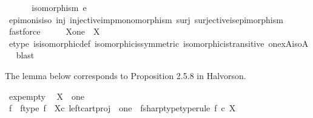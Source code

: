 \begin{isabellebody}
\ \ \isamarkupfalse%
\isanewline
\isanewline
\ \ \isamarkupfalse%
\ {\isachardoublequoteopen}isomorphism\ e{\isachardoublequoteclose}\isanewline
\ \ \ \ \isamarkupfalse%
\ epi{\isacharunderscore}{\kern0pt}mon{\isacharunderscore}{\kern0pt}is{\isacharunderscore}{\kern0pt}iso\ inj\ injective{\isacharunderscore}{\kern0pt}imp{\isacharunderscore}{\kern0pt}monomorphism\ surj\ surjective{\isacharunderscore}{\kern0pt}is{\isacharunderscore}{\kern0pt}epimorphism\ \isamarkupfalse%
\ fastforce\isanewline
\ \ \isamarkupfalse%
\ \isamarkupfalse%
\ {\isachardoublequoteopen}X\isactrlbsup one\isactrlesup \ {\isasymcong}\ X{\isachardoublequoteclose}\isanewline
\ \ \ \ \isamarkupfalse%
\ e{\isacharunderscore}{\kern0pt}type\ is{\isacharunderscore}{\kern0pt}isomorphic{\isacharunderscore}{\kern0pt}def\ isomorphic{\isacharunderscore}{\kern0pt}is{\isacharunderscore}{\kern0pt}symmetric\ isomorphic{\isacharunderscore}{\kern0pt}is{\isacharunderscore}{\kern0pt}transitive\ one{\isacharunderscore}{\kern0pt}x{\isacharunderscore}{\kern0pt}A{\isacharunderscore}{\kern0pt}iso{\isacharunderscore}{\kern0pt}A\ \isamarkupfalse%
\ blast\isanewline
{}\isamarkupfalse%
%
\endisatagproof
{\isafoldproof}%
%
\isadelimproof
%
\endisadelimproof
%
\begin{isamarkuptext}%
The lemma below corresponds to Proposition 2.5.8 in Halvorson.%
\end{isamarkuptext}\isamarkuptrue%
\isamarkupfalse%
\ exp{\isacharunderscore}{\kern0pt}empty{\isacharcolon}{\kern0pt}\isanewline
\ \ {\isachardoublequoteopen}X\isactrlbsup {\isasymemptyset}\isactrlesup \ {\isasymcong}\ one{\isachardoublequoteclose}\isanewline
%
\isadelimproof
%
\endisadelimproof
%
\isatagproof
{}\isamarkupfalse%
\ {\isacharminus}{\kern0pt}\ \isanewline
\ \ \isamarkupfalse%
\ f\ \ f{\isacharunderscore}{\kern0pt}type{\isacharcolon}{\kern0pt}\ {\isachardoublequoteopen}f\ {\isacharequal}{\kern0pt}\ {\isasymalpha}\isactrlbsub X\isactrlesub {\isasymcirc}\isactrlsub c\ {\isacharparenleft}{\kern0pt}left{\isacharunderscore}{\kern0pt}cart{\isacharunderscore}{\kern0pt}proj\ {\isasymemptyset}\ one{\isacharparenright}{\kern0pt}{\isachardoublequoteclose}\ \ fsharp{\isacharunderscore}{\kern0pt}type{\isacharbrackleft}{\kern0pt}type{\isacharunderscore}{\kern0pt}rule{\isacharbrackright}{\kern0pt}{\isacharcolon}{\kern0pt}\ {\isachardoublequoteopen}f\isactrlsup {\isasymsharp}\ {\isasymin}\isactrlsub c\ X\isactrlbsup {\isasymemptyset}\isactrlesup {\isachardoublequoteclose}\isanewline

\end{isabellebody}
